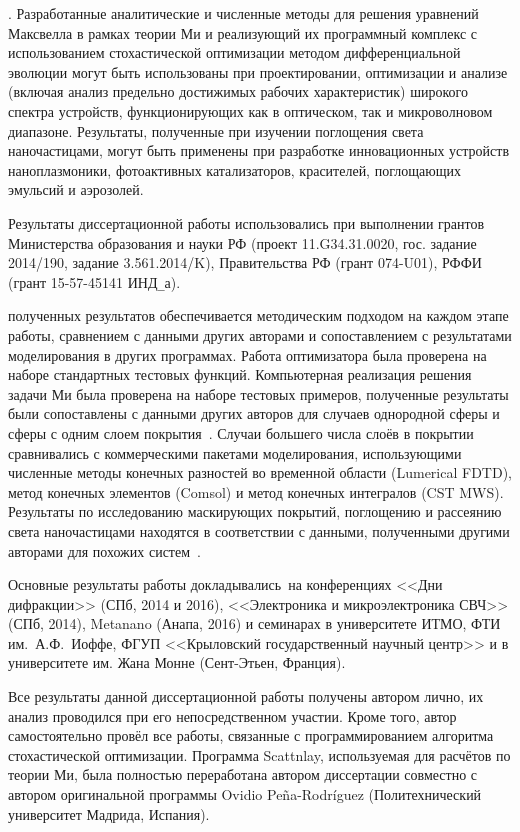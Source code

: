 {\influence}. Разработанные аналитические и численные методы для решения
уравнений Максвелла в рамках теории Ми и реализующий их
программный комплекс с использованием стохастической оптимизации
методом дифференциальной эволюции могут быть использованы при
проектировании, оптимизации и анализе (включая анализ предельно
достижимых рабочих характеристик) широкого спектра устройств,
функционирующих как в оптическом, так и микроволновом диапазоне.
Результаты, полученные при изучении поглощения света наночастицами, могут
быть применены при разработке инновационных устройств
наноплазмоники, фотоактивных катализаторов, красителей, поглощающих
эмульсий и аэрозолей.

Результаты диссертационной работы использовались при выполнении
грантов Министерства образования и науки РФ
(проект 11.G34.31.0020, гос. задание 2014/190, задание 3.561.2014/K),
Правительства РФ (грант 074-U01), РФФИ (грант 15-57-45141 ИНД\verb+_+а).


{\reliability} полученных результатов обеспечивается методическим
подходом на каждом этапе работы, сравнением с данными других авторами
и сопоставлением с результатами моделирования в других программах.
Работа оптимизатора была проверена на наборе стандартных тестовых
функций. Компьютерная реализация решения задачи Ми была проверена на
наборе тестовых примеров, полученные результаты были сопоставлены с
данными других авторов для случаев однородной сферы и сферы с одним
слоем покрытия~\cite{Suzuki-2013, Bashevoy-2005}.  Случаи большего
числа слоёв в покрытии сравнивались с коммерческими пакетами
моделирования, использующими численные методы конечных разностей во
временной области (Lumerical FDTD), метод конечных элементов (Comsol)
и метод конечных интегралов (CST MWS). Результаты по исследованию
маскирующих покрытий, поглощению и рассеянию света наночастицами
находятся в соответствии с данными, полученными другими авторами для
похожих систем~\cite{Semouchkina-2013, Alu-2014, Fan-2011}.

{\probation} Основные результаты работы докладывались~на конференциях
<<Дни дифракции>> (СПб, 2014 и 2016), <<Электроника и микроэлектроника
СВЧ>> (СПб, 2014), Metanano (Анапа, 2016) и семинарах в университете
ИТМО, ФТИ им.~А.Ф.~Иоффе, ФГУП <<Крыловский государственный научный
центр>> и в университете им. Жана Монне (Сент-Этьен, Франция).

{\contribution} Все результаты данной диссертационной работы получены
автором лично, их анализ проводился при его непосредственном участии.
Кроме того, автор самостоятельно провёл все работы, связанные с
программированием алгоритма стохастической оптимизации.  Программа
Scattnlay, используемая для расчётов по теории Ми, была полностью
переработана автором диссертации совместно с автором оригинальной
программы Ovidio Pe\~{n}a-Rodr\'{i}guez (Политехнический университет
Мадрида, Испания).

